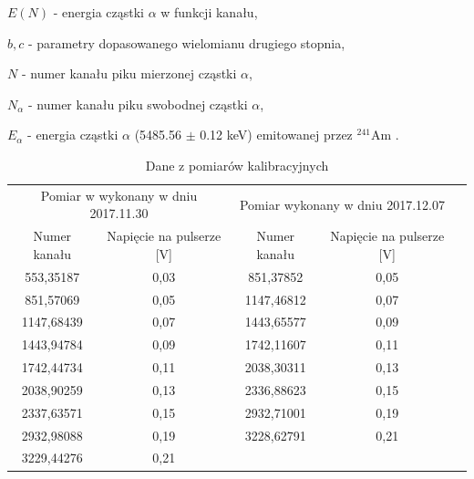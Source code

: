 \documentclass[12pt,a4paper]{article}
\newcommand{\Ameryk}{${}^{241}_{}{}$Am }
\begin{document}
$E(N)$ - energia cząstki $\alpha$ w funkcji kanału, 

 $b,c$ - parametry dopasowanego wielomianu drugiego stopnia, 
 
 $N$ - numer kanału piku mierzonej cząstki $\alpha$, 
 
 $N_\alpha$ - numer kanału piku swobodnej cząstki $\alpha$,
 
  $E_\alpha$ - energia cząstki $\alpha$ (5485.56 $\pm$ 0.12 keV) emitowanej przez \Ameryk.

\begin{table}[H]
\centering
\caption{Dane z pomiarów kalibracyjnych}
\label{kalibracja_tab}
\begin{tabular}{|c|c|ccl}
\cline{1-4}
\multicolumn{2}{|c|}{Pomiar w wykonany w dniu 2017.11.30} & \multicolumn{2}{c|}{Pomiar wykonany w dniu 2017.12.07}                                &  \\ \cline{1-4}
Numer kanału        & Napięcie na pulserze {[}V{]}        & \multicolumn{1}{c|}{Numer kanału} & \multicolumn{1}{c|}{Napięcie na pulserze {[}V{]}} &  \\ \cline{1-4}
553,35187           & 0,03                                & \multicolumn{1}{c|}{851,37852}    & \multicolumn{1}{c|}{0,05}                         &  \\ \cline{1-4}
851,57069           & 0,05                                & \multicolumn{1}{c|}{1147,46812}   & \multicolumn{1}{c|}{0,07}                         &  \\ \cline{1-4}
1147,68439          & 0,07                                & \multicolumn{1}{c|}{1443,65577}   & \multicolumn{1}{c|}{0,09}                         &  \\ \cline{1-4}
1443,94784          & 0,09                                & \multicolumn{1}{c|}{1742,11607}   & \multicolumn{1}{c|}{0,11}                         &  \\ \cline{1-4}
1742,44734          & 0,11                                & \multicolumn{1}{c|}{2038,30311}   & \multicolumn{1}{c|}{0,13}                         &  \\ \cline{1-4}
2038,90259          & 0,13                                & \multicolumn{1}{c|}{2336,88623}   & \multicolumn{1}{c|}{0,15}                         &  \\ \cline{1-4}
2337,63571          & 0,15                                & \multicolumn{1}{c|}{2932,71001}   & \multicolumn{1}{c|}{0,19}                         &  \\ \cline{1-4}
2932,98088          & 0,19                                & \multicolumn{1}{c|}{3228,62791}   & \multicolumn{1}{c|}{0,21}                         &  \\ \cline{1-4}
3229,44276          & 0,21                                &                                   &                                                   &  \\ \cline{1-2}
\end{tabular}
\end{table}
\end{document}
